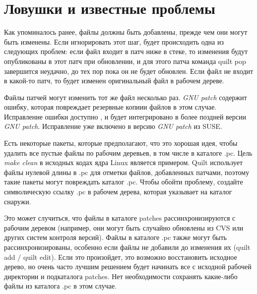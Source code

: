 \documentclass{article}
\newcommand{\quilt}[1]{\textsf{quilt #1}}
\newcommand{\prog}[1]{\textit{#1}}
\begin{document}
\section{Ловушки и известные проблемы}

Как упоминалось ранее, файлы должны быть добавлены, прежде чем они могут быть изменены. Если игнорировать этот шаг, будет происходить одна из следующих проблем: если файл входит в патч ниже в стеке, то изменения будут опубликованы в этот патч при обновлении, и для этого патча команда \quilt{pop} завершится неудачно, до тех пор пока он не будет обновлен. Если файл не входит в какой-то патч, то будет изменен оригинальный файл в рабочем дереве.

Файлы патчей могут изменить тот же файл несколько раз. \prog{GNU patch} содержит ошибку, которая повреждает резервные копиии файлов в этом случае. Исправление ошибки доступно , и будет интегрировано в более поздней версии \textit{GNU patch}. Исправление уже включено в версию \textit{GNU patch} из SUSE.

Есть некоторые пакеты, которые предполагают, что это хорошая идея, чтобы удалить все пустые файлы по рабочим деревьев, в том числе в каталоге \textsf{.pc}. Цель \textit{make clean} в исходных кодах ядра Linux является примером. Quilt использует файлы нулевой длины в \textsf{.pc} для отметки файлов, добавленных патчами, поэтому такие пакеты могут повреждать каталог \textsf{.pc}. Чтобы обойти проблему, создайте символическую ссылку \textsf{.pc} в рабочем дерева, которая указывает на каталог снаружи.

Это может случиться, что файлы в каталоге \textsf{patches} рассинхронизируются с рабочим деревом (например, они могут быть случайно обновлены из CVS или других систем контроля версий). Файлы в каталоге \textsf{.pc} также могут быть рассинхронизированы, особенно если файлы не добавили до изменения их (\quilt{add} / \quilt{edit}). Если это произойдет, это возможно восстановить исходное дерево, но очень часто лучшим решением будет начинать все с исходной рабочей директории и подкаталога \textsf{patches}. Нет необходимости сохранять какие-либо файлы из каталога \textsf{.pc} в этом случае.



\end{document}
